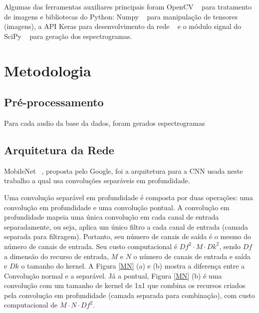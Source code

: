\documentclass{bmvc2k}
\begin{document}
Algumas das ferramentas auxiliares principais foram OpenCV ~\cite{openCV} para tratamento de imagens e bibliotecas do Python: Numpy ~\cite{numpy} para manipulação de tensores (imagens), a API Keras para desenvolvimento da rede ~\cite{keras} e o módulo signal do SciPy ~\cite{scipy} para geração dos espectrogramas.


\section{Metodologia}

\subsection*{Pré-processamento}

Para cada audio da base da dados, foram gerados espectrogramas

\subsection*{Arquitetura da Rede}

MobileNet ~\cite{mobilenets}, proposta pelo Google, foi a arquitetura para a CNN usada neste trabalho a qual usa convoluções separáveis em profundidade.

Uma convolução separável em profundidade é composta por duas operações: uma convolução em profundidade e uma convolução pontual. A convolução em profundidade mapeia uma única convolução em cada canal de entrada separadamente, ou seja, aplica um único filtro a cada canal de entrada (camada  separada para filtragem). Portanto, seu número de canais de saída é o mesmo do número de canais de entrada. Seu custo computacional é $Df^2 \cdot M \cdot Dk^2$, sendo $Df$ a dimensão do recurso de entrada, $M$ e $N$ o número de canais de entrada e saída e $Dk$ o tamanho do kernel. A Figura \ref{MN} (a) e (b)
mostra a diferença entre a Convolução normal e a separável. Já a pontual, Figura \ref{MN} (b) é uma convolução com um tamanho de kernel de 1x1 que combina os recursos criados pela convolução em profundidade (camada separada para combinação), com custo computacional de $M \cdot N \cdot Df^2$.
\end{document}
